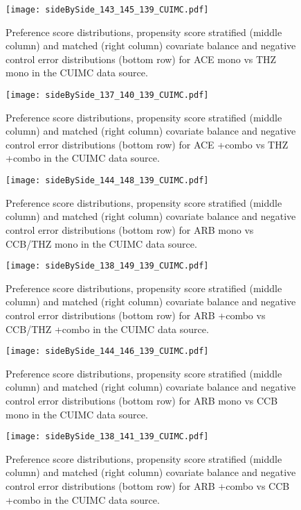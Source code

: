 \documentclass[11pt,]{article}
\begin{document}
\begin{figure}
    \caption{Preference score distributions,
    propensity score stratified (middle column) and matched (right column) covariate balance
    and negative control error distributions (bottom row) for
    ACE mono vs THZ mono in the CUIMC data source.}
    \centerline{
        \texttt{[image: sideBySide\_143\_145\_139\_CUIMC.pdf]}
    }
\end{figure}
\begin{figure}
    \caption{Preference score distributions,
    propensity score stratified (middle column) and matched (right column) covariate balance
    and negative control error distributions (bottom row) for
    ACE +combo vs THZ +combo in the CUIMC data source.}
    \centerline{
        \texttt{[image: sideBySide\_137\_140\_139\_CUIMC.pdf]}
    }
\end{figure}
\begin{figure}
    \caption{Preference score distributions,
    propensity score stratified (middle column) and matched (right column) covariate balance
    and negative control error distributions (bottom row) for
    ARB mono vs CCB/THZ mono in the CUIMC data source.}
    \centerline{
        \texttt{[image: sideBySide\_144\_148\_139\_CUIMC.pdf]}
    }
\end{figure}
\begin{figure}
    \caption{Preference score distributions,
    propensity score stratified (middle column) and matched (right column) covariate balance
    and negative control error distributions (bottom row) for
    ARB +combo vs CCB/THZ +combo in the CUIMC data source.}
    \centerline{
        \texttt{[image: sideBySide\_138\_149\_139\_CUIMC.pdf]}
    }
\end{figure}
\begin{figure}
    \caption{Preference score distributions,
    propensity score stratified (middle column) and matched (right column) covariate balance
    and negative control error distributions (bottom row) for
    ARB mono vs CCB mono in the CUIMC data source.}
    \centerline{
        \texttt{[image: sideBySide\_144\_146\_139\_CUIMC.pdf]}
    }
\end{figure}
\begin{figure}
    \caption{Preference score distributions,
    propensity score stratified (middle column) and matched (right column) covariate balance
    and negative control error distributions (bottom row) for
    ARB +combo vs CCB +combo in the CUIMC data source.}
    \centerline{
        \texttt{[image: sideBySide\_138\_141\_139\_CUIMC.pdf]}
    }
\end{figure}
\end{document}

